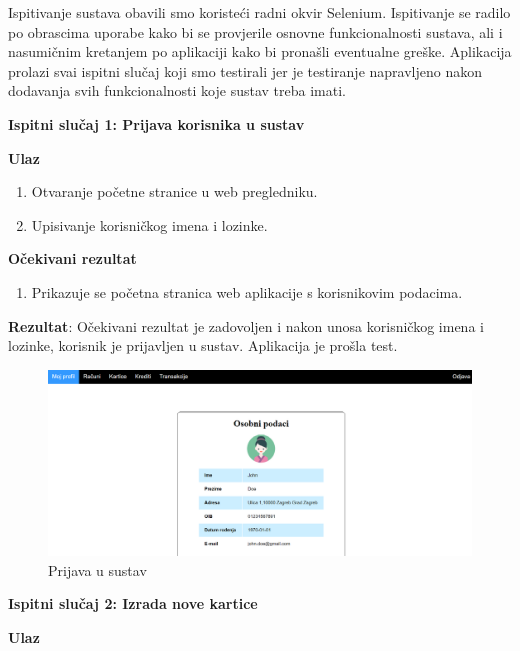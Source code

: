 			 Ispitivanje sustava obavili smo koristeći radni okvir Selenium. Ispitivanje se radilo po obrascima uporabe kako bi se provjerile osnovne funkcionalnosti sustava, ali i nasumičnim kretanjem po aplikaciji kako bi pronašli eventualne greške. Aplikacija prolazi svai ispitni slučaj koji smo testirali jer je testiranje napravljeno nakon dodavanja svih funkcionalnosti koje sustav treba imati.
			 
			 \text{}
			 
			 
		 	\textbf{Ispitni slučaj 1: Prijava korisnika u sustav} 
		 	
		 	\textbf{Ulaz}
		 	
		 	\begin{enumerate}
		 		
		 		\item Otvaranje početne stranice u web pregledniku.
		 		\item Upisivanje korisničkog imena i lozinke.
		 	\end{enumerate}
	 	
	 		\textbf{Očekivani rezultat}
	 		
	 		\begin{enumerate}
	 			\item Prikazuje se početna stranica web aplikacije s korisnikovim podacima.
	 		\end{enumerate}
			
			\textbf{Rezultat}: Očekivani rezultat je zadovoljen i nakon unosa korisničkog imena i lozinke, korisnik je prijavljen u sustav. Aplikacija je prošla test.
			
			\begin{figure}[H]
				\includegraphics[scale=0.4]{slike/prijava.PNG}
				\centering
				\caption{Prijava u sustav}
				\label{fig:prijava}
			\end{figure}
		
		\textbf{Ispitni slučaj 2: Izrada nove kartice} 
		
		\textbf{Ulaz}
		
